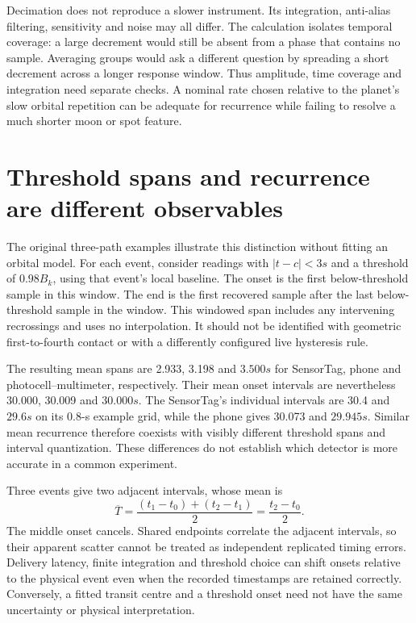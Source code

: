 Decimation does not reproduce a slower instrument. Its integration, anti-alias filtering, sensitivity and noise may all differ. The calculation isolates temporal coverage: a large decrement would still be absent from a phase that contains no sample. Averaging groups would ask a different question by spreading a short decrement across a longer response window. Thus amplitude, time coverage and integration need separate checks. A nominal rate chosen relative to the planet's slow orbital repetition can be adequate for recurrence while failing to resolve a much shorter moon or spot feature.

\section{Threshold spans and recurrence are different observables}
The original three-path examples illustrate this distinction without fitting an orbital model. For each event, consider readings with $|t-c|<3\unit{s}$ and a threshold of $0.98B_k$, using that event's local baseline. The onset is the first below-threshold sample in this window. The end is the first recovered sample after the last below-threshold sample in the window. This windowed span includes any intervening recrossings and uses no interpolation. It should not be identified with geometric first-to-fourth contact or with a differently configured live hysteresis rule.

The resulting mean spans are 2.933, 3.198 and $3.500\unit{s}$ for SensorTag, phone and photocell--multimeter, respectively. Their mean onset intervals are nevertheless 30.000, 30.009 and $30.000\unit{s}$. The SensorTag's individual intervals are 30.4 and $29.6\unit{s}$ on its 0.8-s example grid, while the phone gives 30.073 and $29.945\unit{s}$. Similar mean recurrence therefore coexists with visibly different threshold spans and interval quantization. These differences do not establish which detector is more accurate in a common experiment.

Three events give two adjacent intervals, whose mean is
\begin{equation}
\overline T=\frac{(t_1-t_0)+(t_2-t_1)}{2}
=\frac{t_2-t_0}{2}.
\label{eq:trc-period}
\end{equation}
The middle onset cancels. Shared endpoints correlate the adjacent intervals, so their apparent scatter cannot be treated as independent replicated timing errors. Delivery latency, finite integration and threshold choice can shift onsets relative to the physical event even when the recorded timestamps are retained correctly. Conversely, a fitted transit centre and a threshold onset need not have the same uncertainty or physical interpretation.

